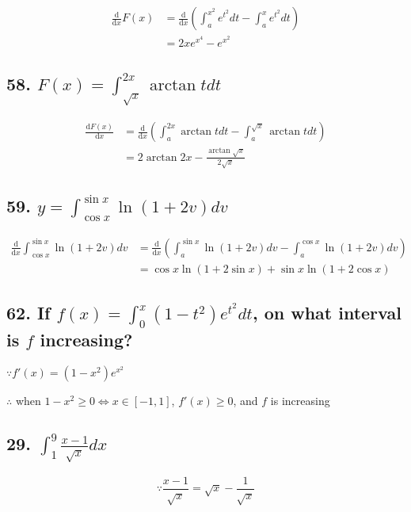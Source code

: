 \documentclass{article}
\begin{document}
    $$\begin{aligned}
        \frac{\mathrm d}{\mathrm dx}F(x) &= \frac{\mathrm d}{\mathrm dx}(\int_a^{x^2} e^{t^2} dt - \int_a^x e^{t^2} dt) \\
        &= 2xe^{x^4} - e^{x^2}
    \end{aligned}$$

    \subsection*{58. $F(x) = \int_{\sqrt x}^{2x} \arctan t dt$}
    
    $$\begin{aligned}
        \frac{\mathrm dF(x)}{\mathrm dx} &= \frac{\mathrm d}{\mathrm dx}(\int_{a}^{2x} \arctan t dt - \int_{a}^{\sqrt x} \arctan t dt) \\
        &= 2\arctan 2x - \frac{\arctan \sqrt x}{2\sqrt x}
    \end{aligned}$$

    \subsection*{59. $y = \int_{\cos x}^{\sin x} \ln(1 + 2v) dv$}

    $$\begin{aligned}
        \frac{\mathrm d}{\mathrm dx}\int_{\cos x}^{\sin x} \ln (1 + 2v) dv &= \frac{\mathrm d}{\mathrm dx}(\int_a^{\sin x} \ln(1 + 2v) dv - \int_a^{\cos x} \ln (1 + 2v) dv) \\
        &= \cos x \ln (1 + 2\sin x) + \sin x \ln (1 + 2\cos x)
    \end{aligned}$$


    \subsection*{62. If $f(x) = \int_0^x(1 - t^2) e^{t^2} dt$, on what interval is $f$ increasing?}

    $\because f'(x) = (1 - x^2)e^{x^2}$

    $\therefore$ when $1 - x^2 \geq 0 \iff x \in [-1, 1]$, $f'(x) \geq 0$, and $f$ is increasing


    \subsection*{29. $\int_1^9\frac{x - 1}{\sqrt x} dx$}

    $$\because \frac{x - 1}{\sqrt x} = \sqrt x - \frac{1}{\sqrt x}$$
\end{document}
